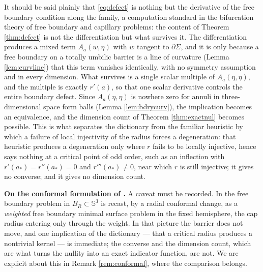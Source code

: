 \documentclass[11pt,a4paper]{amsart}
\theoremstyle{plain}
\theoremstyle{definition}
\newcommand{\Sph}{\mathbb{S}}
\begin{document}
It should be said plainly that \eqref{eq:defect} is nothing but the derivative of the free boundary condition along the family, a computation standard in the bifurcation theory of free boundary and capillary problems: the content of Theorem \ref{thm:defect} is not the differentiation but what survives it. The differentiation produces a mixed term $A_a(w,\eta)$ with $w$ tangent to $\partial\Sigma$, and it is only because a free boundary on a totally umbilic barrier is a line of curvature (Lemma \ref{lem:curvline}) that this term vanishes identically, with no symmetry assumption and in every dimension. What survives is a single scalar multiple of $A_a(\eta,\eta)$, and the multiple is exactly $r'(a)$, so that one scalar derivative controls the entire boundary defect. Since $A_a(\eta,\eta)$ is nowhere zero for annuli in three-dimensional space form balls (Lemma \ref{lem:bdrycurv}), the implication becomes an equivalence, and the dimension count of Theorem \ref{thm:exactnul} becomes possible. This is what separates the dictionary from the familiar heuristic by which a failure of local injectivity of the radius forces a degeneration: that heuristic produces a degeneration only where $r$ fails to be locally injective, hence says nothing at a critical point of odd order, such as an inflection with $r'(a_*)=r''(a_*)=0$ and $r'''(a_*)\neq 0$, near which $r$ is still injective; it gives no converse; and it gives no dimension count.

\medskip
\noindent\textbf{On the conformal formulation of \cite{NZ1}.} A caveat must be recorded. In \cite[\S 2.5]{NZ1} the free boundary problem in $B_R\subset\Sph^3$ is recast, by a radial conformal change, as a \emph{weighted} free boundary minimal surface problem in the fixed hemisphere, the cap radius entering only through the weight. In that picture the barrier does not move, and one implication of the dictionary --- that a critical radius produces a nontrivial kernel --- is immediate; the converse and the dimension count, which are what turns the nullity into an exact indicator function, are not. We are explicit about this in Remark \ref{rem:conformal}, where the comparison belongs.
\end{document}
